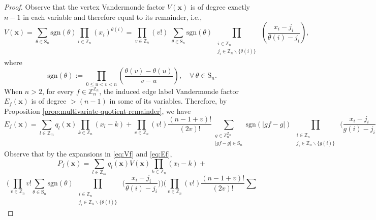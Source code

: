 \begin{proof}
Observe that the vertex Vandermonde factor $V(\mathbf{x})$ is of degree exactly $n-1$ in each variable and therefore equal
to its remainder, i.e.,
\begin{equation}\label{eq:Vf}
V(\mathbf{x})=\sum_{\theta\in\text{S}_{n}}\text{sgn}(\theta)\prod_{i\in\mathbb{Z}_{n}}(x_{i})^{\theta(i)}=\prod_{v\in\mathbb{Z}_{n}}(v!)\;\sum_{\theta\in\text{S}_{n}}\text{sgn}(\theta)\prod_{\begin{array}{c}
\substack{i\in\mathbb{Z}_{n}\\
j_{i}\in\mathbb{Z}_{n}\backslash\{\theta(i)\}
}
\end{array}}\left(\frac{x_{i}-j_{i}}{\theta(i)-j_{i}}\right),
\end{equation}
where 
\begin{equation}
\text{sgn}(\theta):=\prod_{0\le u<v<n}\left(\frac{\theta(v)-\theta(u)}{v-u}\right),\quad\forall\,\theta\in\text{S}_{n}.
\end{equation}
When $n>2$, for every $f\in\mathbb{Z}_{n}^{\mathbb{Z}_{n}}$, the induced edge label Vandermonde factor $E_f(\mathbf{x})$
is of degree $>(n-1)$ in some of its variables. Therefore, by Proposition  \ref{prop:multivariate-quotient-remainder}, we have
\begin{equation}\label{eq:Ef}
E_{f}(\mathbf{x})=\sum_{l\in\mathbb{Z}_{m}}q_{l}(\mathbf{x})\prod_{k\in\mathbb{Z}_{n}}(x_{l}-k)+\prod_{v\in\mathbb{Z}_{n}}(v!)\frac{(n-1+v)!}{(2v)!}\sum_{\begin{array}{c}
g\in\mathbb{Z}_{n}^{\mathbb{Z}_{n}}\\
|gf-g|\in\text{S}_{n}
\end{array}}\text{sgn}(|gf-g|)\prod_{\begin{array}{c}
\substack{i\in\mathbb{Z}_{n}\\
j_{i}\in\mathbb{Z}_{n}\backslash\{g(i)\}
}
\end{array}}\big(\frac{x_{i}-j_{i}}{g(i)-j_{i}}\big).
\end{equation}
Observe that by the expansions in \ref{eq:Vf} and \ref{eq:Ef}, 
\[
P_{f}(\mathbf{x})=\sum_{l\in\mathbb{Z}_{m}}q_{l}(\mathbf{x})V(\mathbf{x})\prod_{k\in\mathbb{Z}_{n}}(x_{l}-k)+
\]
\[
\bigg(\prod_{v\in\mathbb{Z}_{n}}v!\sum_{\theta\in\text{S}_{n}}\text{sgn}(\theta)\prod_{\begin{array}{c}
\substack{i\in\mathbb{Z}_{n}\\
j_{i}\in\mathbb{Z}_{n}\backslash\{\theta(i)\}
}
\end{array}}\big(\frac{x_{i}-j_{i}}{\theta(i)-j_{i}}\big)\bigg)\bigg(\prod_{v\in\mathbb{Z}_{n}}(v!)\frac{(n-1+v)!}{(2v)!}\sum_{\begin{array}{c}

\end{array}}\]
\end{proof}
